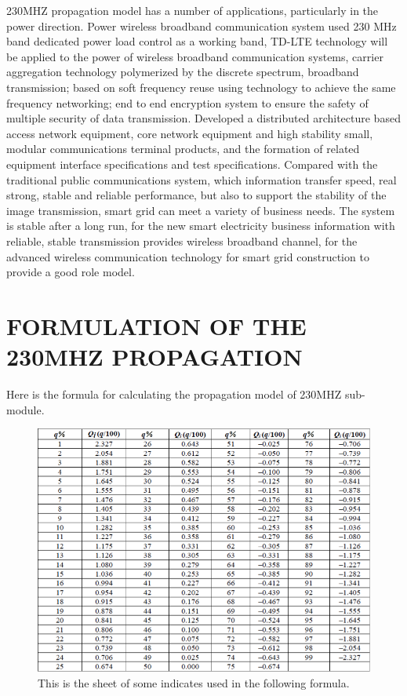 \documentclass[runningheads,a4paper]{llncs}
\begin{document}
230MHZ propagation model has a number of applications, particularly in the power direction\cite{bb}. Power wireless broadband communication system used 230 MHz band dedicated power load control as a working band, TD-LTE technology will be applied to the power of wireless broadband communication systems, carrier aggregation technology polymerized by the discrete spectrum, broadband transmission; based on soft frequency reuse using technology to achieve the same frequency networking; end to end encryption system to ensure the safety of multiple security of data transmission. Developed a distributed architecture based access network equipment, core network equipment and high stability small, modular communications terminal products, and the formation of related equipment interface specifications and test specifications. Compared with the traditional public communications system, which information transfer speed, real strong\cite{cc}, stable and reliable performance, but also to support the stability of the image transmission, smart grid can meet a variety of business needs. The system is stable after a long run, for the new smart electricity business information with reliable, stable transmission provides wireless broadband channel, for the advanced wireless communication technology for smart grid construction to provide a good role model.

\section{FORMULATION OF THE 230MHZ PROPAGATION}
\label{sec:exp}

Here is the formula for calculating the propagation model of 230MHZ sub-module.

\begin{figure}
\centerline{\includegraphics[width=15cm]{sheet.png}}
\caption{This is the sheet of some indicates used in the following formula.}
\label{f:fralfamap}
\end{figure}
\end{document}
